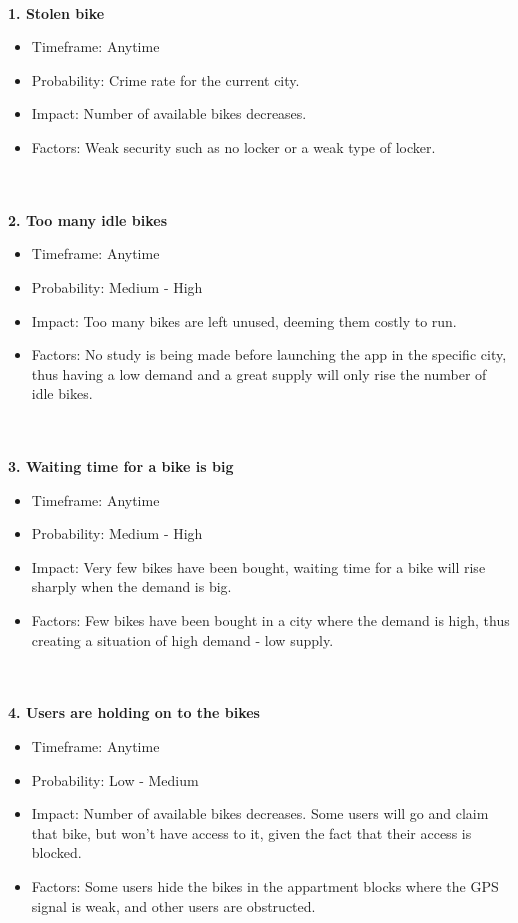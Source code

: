 \documentclass[a4paper]{article}
\begin{document}
\ \\
\textbf{1. Stolen bike}
\begin{itemize}
\item Timeframe: Anytime
\item Probability: Crime rate for the current city.
\item Impact: Number of available bikes decreases.
\item Factors: Weak security such as no locker or a weak type of locker.
\end{itemize}
\ \\ \ \\ 
\textbf{2. Too many idle bikes}
\begin{itemize}
\item Timeframe: Anytime
\item Probability: Medium - High
\item Impact: Too many bikes are left unused, deeming them costly to run.
\item Factors: No study is being made before launching the app in the specific city, thus having a low demand and a great supply will only rise the number of idle bikes.
\end{itemize}
\ \\ \ \\ 
\textbf{3. Waiting time for a bike is big}
\begin{itemize}
\item Timeframe: Anytime 
\item Probability: Medium - High
\item Impact: Very few bikes have been bought, waiting time for a bike will rise sharply when the demand is big.
\item Factors: Few bikes have been bought in a city where the demand is high, thus creating a situation of high demand - low supply.
\end{itemize}
\ \\ \ \\ 
\textbf{4. Users are holding on to the bikes}
\begin{itemize}
\item Timeframe: Anytime 
\item Probability: Low - Medium 
\item Impact: Number of available bikes decreases. Some users will go and claim that bike, but won't have access to it, given the fact that their access is blocked.
\item Factors: Some users hide the bikes in the appartment blocks where the GPS signal is weak, and other users are obstructed.
\end{itemize}
\end{document}
